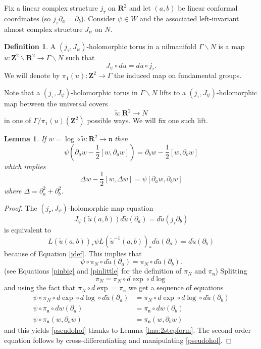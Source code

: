 \documentclass[11pt]{amsart}
\newcommand{\RR}{\mathbf{R}}
\newcommand{\ZZ}{\mathbf{Z}}
\newcommand{\WW}{W}
\newcommand{\torus}{\ZZ^2\backslash\RR^2}
\newcommand{\nilman}{\Gamma\backslash N}
\newcommand{\nn}{\mathfrak{n}}
\numberwithin{equation}{section}
\newtheorem{lma}[equation]{Lemma}
\theoremstyle{definition}
\newtheorem{dfn}[equation]{Definition}
\theoremstyle{remark}
\begin{document}
Fix a linear complex structure $j_{\tau}$ on $\RR^2$ and let $(a,b)$ be linear conformal coordinates (so $j_{\tau}\partial_a=\partial_b$). Consider $\psi\in\WW$ and the associated left-invariant almost complex structure $J_{\psi}$ on $N$.
\begin{dfn}
A $(j_{\tau},J_{\psi})$-holomorphic torus in a nilmanifold $\nilman$ is a map $u\colon\torus\to\nilman$ such that
\[J_{\psi}\circ du=du\circ j_{\tau}.\]
We will denote by $\pi_1(u)\colon\ZZ^2\to\Gamma$ the induced map on fundamental groups.
\end{dfn}
Note that a $(j_{\tau},J_{\psi})$-holo\-mor\-phic torus in $\nilman$ lifts to a $(j_{\tau},J_{\psi})$-holomorphic map between the universal covers
\[\tilde{u}\colon\RR^2\to N\]
in one of $\Gamma/\pi_1(u)(\ZZ^2)$ possible ways. We will fix one such lift.
\begin{lma}
If $w=\log\circ \tilde{u}\colon\RR^2\to\nn$ then
\begin{equation}\label{pseudohol}\psi\left(\partial_aw-\frac{1}{2}[w,\partial_aw]\right)=\partial_bw-\frac{1}{2}[w,\partial_bw]\end{equation}
which implies
\begin{equation}\label{harmo}\Delta w-\frac{1}{2}[w,\Delta w]=\psi[\partial_a w,\partial_b w]\end{equation}
where $\Delta=\partial_a^2+\partial_b^2$.
\end{lma}
\begin{proof}
The $(j_{\tau},J_{\psi})$-holomorphic map equation
\[J_{\psi}(\tilde{u}(a,b))d\tilde{u}(\partial_a)=d\tilde{u}(j_{\tau}\partial_b)\]
is equivalent to
\[L(\tilde{u}(a,b))_*\psi L(\tilde{u}^{-1}(a,b))_*d\tilde{u}(\partial_a)=d\tilde{u}(\partial_b)\]
because of Equation \eqref{jdef}. This implies that
\[\psi\circ\pi_N\circ d\tilde{u}(\partial_a)=\pi_N\circ d\tilde{u}(\partial_b).\]
(see Equations \eqref{pinbig} and \eqref{pinlittle} for the definition of $\pi_N$ and $\pi_{\nn}$) Splitting
\[\pi_N=\pi_N\circ d\exp\circ d\log\]
and using the fact that $\pi_N\circ d\exp=\pi_{\nn}$ we get a sequence of equations
\begin{align*}
\psi\circ\pi_N\circ d\exp\circ d\log\circ d\tilde{u}(\partial_a)&=\pi_N\circ d\exp\circ d\log\circ d\tilde{u}(\partial_b)\\
\psi\circ\pi_{\nn}\circ dw(\partial_a)&=\pi_{\nn}\circ dw(\partial_b)\\
\psi\circ\pi_{\nn}(w,\partial_aw)&=\pi_{\nn}(w,\partial_bw)
\end{align*}
and this yields \eqref{pseudohol} thanks to Lemma \ref{lma:2stepform}. The second order equation follows by cross-diff\-er\-enti\-at\-ing and manipulating \eqref{pseudohol}.
\end{proof}
\end{document}
